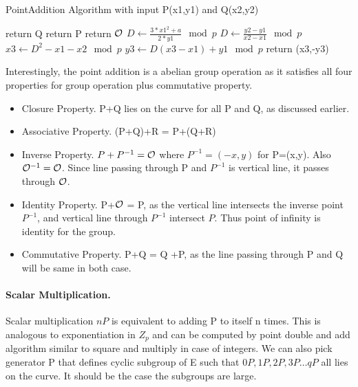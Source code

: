 \makeatletter
\def\BState{\State\hskip-\ALG@thistlm}
\makeatother

\begin{algorithm}
\caption{PointAddition Algorithm with input P(x1,y1) and Q(x2,y2) }\label{algo}
\begin{algorithmic}[1]
return Q
\EndIf
{}
return P
\EndIf
{}
return $\cal O$
\EndIf
{}
\State $D \gets \frac{3*{x1}^2+a}{2*y1} \mod p$
\Else 
\State $D \gets \frac{y2-y1}{x2-x1} \mod p$
\EndIf
\State $x3 \gets D^2-x1-x2 \mod p$
\State $y3 \gets D(x3-x1) + y1 \mod p$
\State return (x3,-y3)
\EndProcedure
\end{algorithmic}
\end{algorithm}

Interestingly, the point addition is a abelian group operation as it satisfies all four properties for group operation plus commutative property.
\begin{itemize}
\item Closure Property. P+Q lies on the curve for all P and Q, as discussed earlier.
\item Associative Property. (P+Q)+R = P+(Q+R)
\item Inverse Property. $P + P^{-1} = \cal O $ where $P^{-1} = (-x,y)$ for P=(x,y). Also ${\cal O}^{-1} = \cal O$. Since line passing through P and $P^{-1}$ is vertical line, it passes through $\cal O$.
\item Identity Property. P+$\cal O$ = P, as the vertical line intersects the inverse point $P^{-1}$, and vertical line through $P^{-1}$ intersect $P$. Thus point of infinity is identity for the group.
\item Commutative Property. P+Q = Q +P, as the line passing through P and Q will be same in both case.
\end{itemize}

\paragraph{Scalar Multiplication.} Scalar multiplication $nP$ is equivalent to adding P to itself n times. This is analogous to exponentiation in $Z_p$ and can be computed by point double and add algorithm similar to square and multiply in case of integers. We can also pick generator P that defines cyclic subgroup of E such that $0P, 1P, 2P, 3P \dots qP$ all lies on the curve. It should be the case the subgroups are large.


